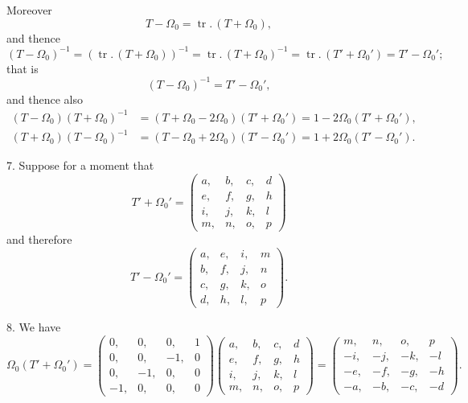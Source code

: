 \documentclass[11pt,a4paper]{article}
\theoremstyle{plain}
\DeclareMathOperator{\tr}{tr}
\begin{document}
Moreover
\[
T - \Omega_0 = \tr.\,(T + \Omega_0),
\]
and thence
\[
(T - \Omega_0)^{-1} = (\tr.\,(T + \Omega_0))^{-1} = \tr.\,(T + \Omega_0)^{-1} = \tr.\,(T' + \Omega_0') = T' - \Omega_0';
\]
that is
\[
(T - \Omega_0)^{-1} = T' - \Omega_0',
\]
and thence also
\begin{align*}
(T - \Omega_0)(T + \Omega_0)^{-1} &= (T + \Omega_0 - 2\Omega_0)(T' + \Omega_0') = 1 - 2\Omega_0(T' + \Omega_0'), \\
(T + \Omega_0)(T - \Omega_0)^{-1} &= (T - \Omega_0 + 2\Omega_0)(T' - \Omega_0') = 1 + 2\Omega_0(T' - \Omega_0').
\end{align*}

7. Suppose for a moment that
\[
T' + \Omega_0' =
\begin{pmatrix}
a, & b, & c, & d \\
e, & f, & g, & h \\
i, & j, & k, & l \\
m, & n, & o, & p
\end{pmatrix}
\]
and therefore
\[
T' - \Omega_0' =
\begin{pmatrix}
a, & e, & i, & m \\
b, & f, & j, & n \\
c, & g, & k, & o \\
d, & h, & l, & p
\end{pmatrix}.
\]

8. We have
\[
\Omega_0(T' + \Omega_0') =
\begin{pmatrix}
0, & 0, & 0, & 1 \\
0, & 0, & -1, & 0 \\
0, & -1, & 0, & 0 \\
-1, & 0, & 0, & 0
\end{pmatrix}
\begin{pmatrix}
a, & b, & c, & d \\
e, & f, & g, & h \\
i, & j, & k, & l \\
m, & n, & o, & p
\end{pmatrix}
=
\begin{pmatrix}
m, & n, & o, & p \\
-i, & -j, & -k, & -l \\
-e, & -f, & -g, & -h \\
-a, & -b, & -c, & -d
\end{pmatrix}.
\]
\end{document}
